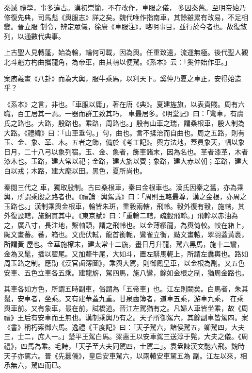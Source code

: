 
\begin{pinyinscope}

 秦滅
 禮學，事多違古。漢初崇簡，不存改作，車服之儀，
 多因秦舊。至明帝始乃修復先典，司馬彪《輿服志》詳之矣。魏代唯作指南車，其餘雖累有改易，不足相變。晉立服
 制令，辨定眾儀，徐廣《車服注》，略明事目，並行於今者也。故復敘列，以通數代典事。



 上古聖人見轉蓬，始為輪，輪何可載，因為輿。任重致遠，流運無極。後代聖人觀北斗魁方杓曲攜龍角，為帝車，曲其輈以便駕。《系本》云：「奚仲始作車。」



 案庖羲畫《八卦》而為大輿，服牛乘馬，以利天下。奚仲乃夏之車正，安得始造乎？



 《系本》之言，非也。「車服以庸」，著在唐《典》。夏建旌旗，以表貴賤。周有六職，百工居其一焉。一器而群工致其巧，
 車最居多。《明堂記》曰：「鸞車，有虞氏之路也。大路，殷路也。乘路，周路也。」殷有山車之瑞，謂桑根車，殷人制為大路。《禮緯》曰：「山車垂句。」句，曲也。言不揉治而自曲也。周之五路，則有玉、金、象、革、木。五者之飾，備於《考工記》。輿方法地，蓋員象天，輻以象日月，二十八弓以象列宿。玉、金、象者，飾車諸末，因為名也。革者漆革，木者漆木也。玉路，建大常以祀；金路，建大旂以賓；象路，建大赤以朝；革路，建大白以戎；木路，建大麾以田。黑色，夏所尚也。



 秦閱三代之
 車，獨取殷制。古曰桑根車，秦曰金根車也。漢氏因秦之舊，亦為乘輿，所謂乘殷之路者也。《禮論·輿駕議》曰：「周則玉輅最尊，漢之金根，亦周之玉路也。」漢制乘輿金根車，輪皆朱斑，重轂兩轄，飛軨。轂外復有轂，施轄，其外復設轄，施銅貫其中。《東京賦》曰：「重輪二轄，疏轂飛軨。」飛軨以赤油為之，廣八寸，長注地，繫軸頭，謂之飛軨也。以金薄繆龍，為輿倚較。較在箱上，颭文畫蕃。蕃，箱也。文虎伏軾，龍首銜軛，鸞雀立衡，颭文畫轅，翠羽蓋黃裹，所謂黃
 屋也。金華施橑末，建太常十二旒，畫日月升龍，駕六黑馬，施十二鸞，金為叉髦，插以翟尾。又加犛牛尾，大如斗，置左騑馬軛上，所謂左纛輿也。路如周玉路之制。應劭《漢官鹵簿圖》，乘輿大駕，則御鳳皇車，以金根為副。又五色安車、五色立車各五乘。建龍旂，駕四馬，施八鸞，餘如金根之制，猶周金路也。



 其車各如方色，所謂五時副車，俗謂為「五帝車」也。江左則闕矣。白馬者，朱其鬣，安車者，坐乘。又有建華蓋九重。甘泉鹵簿者，道車五乘，游車九乘，
 在乘輿車前。又有象車，最在前，試橋道。晉江左駕猶有之。凡婦人車皆坐乘，故《周禮》王后有安車而王無也。漢制乘輿乃有之。天子所御駕六，其餘副車皆駕四。案《書》稱朽索御六馬。逸禮《王度記》曰：「天子駕六，諸侯駕五，卿駕四，大夫三，士二，庶人一。」楚平王駕白馬。梁惠王以安車駕三送淳于髡，大夫之儀。《周禮》，四馬為乘。毛詩，「天子至大夫同駕四，士駕二」。袁盎諫漢文馳六飛。魏時天子亦駕六。晉《先蠶儀》，皇后安車駕六，以兩轅安車駕五為
 副。江左以來，相承無六，駕四而已。




\end{pinyinscope}

